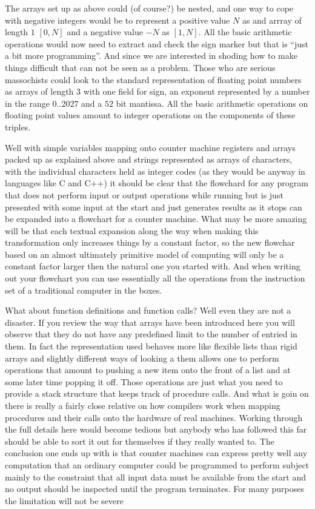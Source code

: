 The arrays set up as above could (of course?) be nested, and one way to
cope with negative integers would be to represent a positive value $N$ as
and arrray of length $1$ $[0,N]$ and a negative value $-N$ as $[1,N]$.
All the basic arithmetic operations would now need to extract and check the
sign marker but that is ``just a bit more programming''. And since we
are interested in shoding how to make things difficult that can not
be seen as a problem. Those who are serious massochists could look
to the standard representation of floating point numbers as arrays of
length 3 with one field for sign, an exponent represented by a number
in the range $0..2027$ and a $52$ bit mantissa. All the basic arithmetic
operations on floating point values amount to integer operations on the
components of these triples.

Well with simple variables mapping onto counter machine registers and arrays
packed up as explained above and strings represented as arrays of
characters, with the individual characters held as integer codes (as they
would be anyway in languages like C and C++) it should be clear that
the flowchard for any program that does not perform input or output
operations while running but is just presented with some input at the
start and just generates results as it stops can be expanded into a flowchart
for a counter machine. What may be more amazing will be that each textual
expansion along the way when making this transformation only increases things
by a constant factor, so the new flowchar based on an almost ultimately
primitive model of computing will only be a constant factor larger then
the natural one you started with. And when writing out your flowchart
you can use essentially all the operations from the instruction set
of a traditional computer in the boxes.

What about function definitions and function calls? Well even they are
not a disaster. If you review the way that arrays have been introduced here
you will observe that they do not have any predefined limit to the
number of entried in them. In fact the representation used behaves more
like flexible lists than rigid arrays and slightly different ways
of looking a them allows one to perform operations that amount to
pushing a new item onto the front of a list and at some later time
popping it off. Those operations are just what you need to provide a
stack structure that keeps track of procedure calls. And what is goin on there
is really a fairly close relative on how compilers work when mapping
procedures and their calls onto the hardware of real machines. Working
through the full details here would become tedious but anybody who has
followed this far should be able to sort it out for themselves if they
really wanted to. The conclusion one ends up with is that counter machines
can express pretty well any computation that an ordinary computer could
be programmed to perform subject mainly to the constraint that all
input data must be available from the start and no output should be
inspected until the program terminates. For many purposes the limitation
will not be severe

